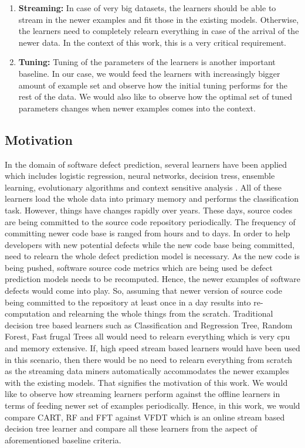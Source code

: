 \documentclass[sigplan]{acmart}\settopmatter{printfolios=true,printccs=false,printacmref=false}
\begin{document}
\begin{enumerate}
	\item \textbf{Streaming: } In case of very big datasets, the learners should be able to stream in the newer examples and fit those in the existing models. Otherwise, the learners need to completely relearn everything in case of the arrival of the newer data. In the context of this work, this is a very critical requirement.
	\item \textbf{Tuning: } Tuning of the parameters of the learners is another important baseline. In our case, we would feed the learners with increasingly bigger amount of example set and observe how the initial tuning performs for the rest of the data. We would also like to observe how the optimal set of tuned parameters changes when newer examples comes into the context.
\end{enumerate}

\subsection{Motivation}
In the domain of software defect prediction, several learners have been applied which includes logistic regression, neural networks, decision tress, ensemble learning, evolutionary algorithms and context sensitive analysis \cite{menzies2011local, basili1996validation, hassan2009predicting, zimmermann2007predicting, bettenburg2012think, dietterich2000experimental,briand2001replicated,panichella2014cross}. All of these learners load the whole data into primary memory and performs the classification task. However, things have changes rapidly over years. These days, source codes are being committed to the source code repository periodically. The frequency of committing newer code base is ranged from hours and to days. In order to help developers with new potential defects while the new code base being committed, need to relearn the whole defect prediction model is necessary. As the new code is being pushed, software source code metrics which are being used be defect prediction models needs to be recomputed. Hence, the newer examples of software defects would come into play. So, assuming that newer version of source code being committed to the repository at least once in a day results into re-computation and relearning the whole things from the scratch. Traditional decision tree based learners such as Classification and Regression Tree, Random Forest, Fast frugal Trees all would need to relearn everything which is very cpu and memory extensive. If, high speed stream based learners would have been used in this scenario, then there would be no need to relearn everything from scratch as the streaming data miners automatically accommodates the newer examples with the existing models. That signifies the motivation of this work. We would like to observe how streaming learners perform against the offline learners in terms of feeding newer set of examples periodically. Hence, in this work, we would compare CART, RF and FFT against VFDT which is an online stream based decision tree learner and compare all these learners from the aspect of aforementioned baseline criteria.
\end{document}
